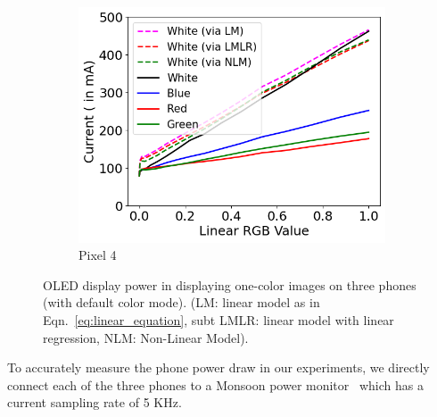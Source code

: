 \begin{figure}[tp]
\begin{subfigure}[]{0.31\textwidth}
		\includegraphics[width=\textwidth]{figure/004_Pixel4_linear_model.png}
		\caption{Pixel 4}
		\label{fig:initial_evaluation_2_z3_w}
	\end{subfigure}
\vspace{-0.1in}
	\caption{OLED display power in displaying one-color images on three phones (with default color mode).
		(LM: linear model as in Eqn.~\ref{eq:linear_equation},
subt		 LMLR: linear model with linear regression, NLM: Non-Linear Model).
}
        \vspace{-0.1in}
        \label{fig:initial_evaluation_2}
\end{figure}

To accurately measure the phone power draw in our experiments, 
we directly connect each of the three
phones to a Monsoon power monitor~\cite{powermonitor}
which has a current sampling rate of 5 KHz.

